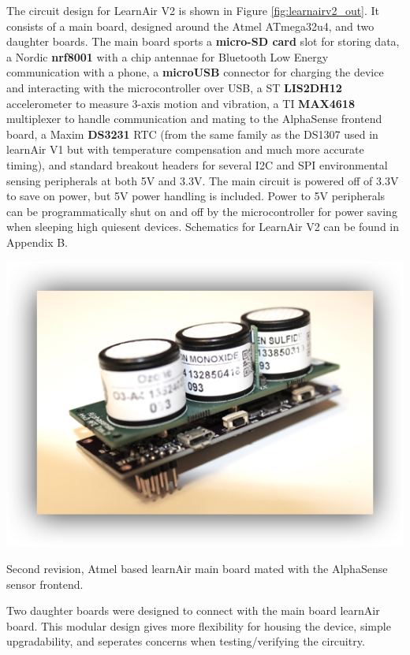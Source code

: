 The circuit design for LearnAir V2 is shown in Figure \ref{fig:learnairv2_out}.  It consists of a main board, designed around the Atmel ATmega32u4, and two daughter boards.  The main board sports a \textbf{micro-SD card} slot for storing data, a Nordic \textbf{nrf8001} with a chip antennae for Bluetooth Low Energy communication with a phone, a \textbf{microUSB} connector for charging the device and interacting with the microcontroller over USB, a ST \textbf{LIS2DH12} accelerometer to measure 3-axis motion and vibration, a TI \textbf{MAX4618} multiplexer to handle communication and mating to the AlphaSense frontend board, a Maxim \textbf{DS3231} RTC (from the same family as the DS1307 used in learnAir V1 but with temperature compensation and much more accurate timing), and standard breakout headers for several I2C and SPI environmental sensing peripherals at both 5V and 3.3V.  The main circuit is powered off of 3.3V to save on power, but 5V power handling is included.  Power to 5V peripherals can be programmatically shut on and off by the microcontroller for power saving when sleeping high quiesent devices.  Schematics for LearnAir V2 can be found in Appendix B.

\begin{marginfigure}[3.5cm]
 	\includegraphics[width=\textwidth]{visuals/learnairV2}               
 	 \caption{Second revision, Atmel based learnAir main board mated with the AlphaSense sensor frontend.}
  	\label{fig:learnairV2}
\end{marginfigure}

Two daughter boards were designed to connect with the main board learnAir board.  This modular design gives more flexibility for housing the device, simple upgradability, and seperates concerns when testing/verifying the circuitry.  

